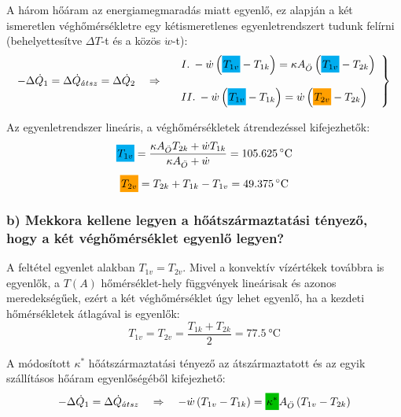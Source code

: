 A három hőáram az energiamegmaradás miatt egyenlő, ez alapján a két ismeretlen véghőmérsékletre egy kétismeretlenes egyenletrendszert tudunk felírni (behelyettesítve $\Delta T$-t és a közös $\dot{w}$-t):
\begin{equation}
	-\Delta \dot{Q}_1 = \Delta \dot{Q}_{\acute{a}tsz} = \Delta \dot{Q}_2
	\quad \Rightarrow \quad 
	\left.
		\begin{array}{l}
			I.\: -\dot{w} \left(\highlight{cyan}{T_{1v}} - T_{1k}\right) 
			= 
			\kappa A_{\ddot{O}} \left(\highlight{cyan}{T_{1v}} - T_{2k}\right) \\ \\
			II.\: -\dot{w} \left(\highlight{cyan}{T_{1v}} - T_{1k}\right) 
			= 
			\dot{w} \left(\highlight{orange!75!yellow}{T_{2v}} - T_{2k}\right)
		\end{array}
	\right\rbrace
\end{equation}

Az egyenletrendszer lineáris, a véghőmérsékletek átrendezéssel kifejezhetők:
\begin{equation}
	\highlight{cyan}{T_{1v}} = \frac{\kappa A_{\ddot{O}} T_{2k} + \dot{w} T_{1k}}{\kappa A_{\ddot{O}} + \dot{w}} = \SI{105.625}{\celsius}
\end{equation}
\begin{equation}
	\highlight{orange!75!yellow}{T_{2v}} = T_{2k} + T_{1k} - T_{1v} = \SI{49.375}{\celsius}
\end{equation}

\subsubsection*{b) Mekkora kellene legyen a hőátszármaztatási tényező, hogy a két véghőmérséklet egyenlő legyen?}
A feltétel egyenlet alakban $T_{1v} = T_{2v}$. Mivel a konvektív vízértékek továbbra is egyenlők, a $T\left(A\right)$ hőmérséklet-hely függvények lineárisak és azonos meredekségűek, ezért a két véghőmérséklet úgy lehet egyenlő, ha a kezdeti hőmérsékletek átlagával is egyenlők:
\begin{equation}
	T_{1v} = T_{2v} = \dfrac{T_{1k} + T_{2k}}{2} = \SI{77.5}{\celsius}
\end{equation}

A módosított $\kappa^*$ hőátszármaztatási tényező az átszármaztatott és az egyik szállításos hőáram egyenlőségéből kifejezhető:
\begin{equation}
	-\Delta \dot{Q}_1 = \Delta \dot{Q}_{\acute{a}tsz}
	\quad \Rightarrow \quad 
	-\dot{w} \left(T_{1v} - T_{1k}\right) 
	= 
	\highlight{green!75!black}{\kappa^*} A_{\ddot{O}} \left(T_{1v} - T_{2k}\right)
\end{equation}

